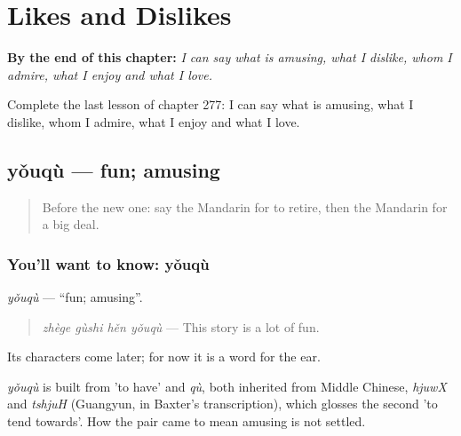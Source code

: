 
\chapter{Likes and Dislikes}
\label{ch:zh-likes-and-dislikes}

\begin{chapteropening}
\textbf{By the end of this chapter:} \emph{I can say what is amusing, what I dislike, whom I admire, what I enjoy and what I love.}

Complete the last lesson of chapter 277: I can say what is amusing, what I dislike, whom I admire, what I enjoy and what I love.
\end{chapteropening}

\section[yǒuqù]{yǒuqù — fun; amusing}

\label{lesson:ZH-C277-youqu}



\begin{quote}
Before the new one: say the Mandarin for to retire, then the Mandarin for a big deal.
\end{quote}

\subsection*{You'll want to know: yǒuqù}
\emph{yǒuqù} — \textquotedblleft{}fun; amusing\textquotedblright{}.

\begin{quote}
\emph{zhège gùshi hěn yǒuqù} — This story is a lot of fun.
\end{quote}

Its characters come later; for now it is a word for the ear.

\begin{cousinweb}
\emph{yǒuqù} is built from  'to have' and \emph{qù}, both inherited from Middle Chinese, \emph{hjuwX} and \emph{tshjuH} (Guangyun, in Baxter's transcription), which glosses the second 'to tend towards'. How the pair came to mean amusing is not settled.
\end{cousinweb}

